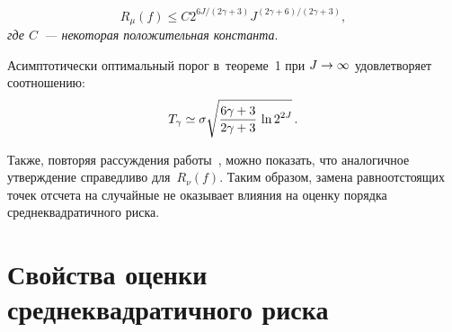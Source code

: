 \begin{multicols}{2}
\noindent
\begin{equation*}
R_{\mu}(f) \leqslant 
C2^{6J/(2\gamma+3)}J^{(2\gamma+6)/(2\gamma+3)},
\end{equation*}
\textit{где $C$~--- некоторая положительная константа}.

\columnbreak

Асимптотически оптимальный порог в~теореме~1 при $J\hm\to\infty$ 
удовлетворяет соотношению:
$$
T_\gamma\simeq\sigma\sqrt{\displaystyle\frac{\displaystyle 6\gamma+3\mathstrut}{\displaystyle 2\gamma+3\mathstrut}\,
\ln2^{2J}}\,.
$$

Также, повторяя рассуждения работы~\cite{CB99}, можно показать, что 
аналогичное утверждение справедливо для~$R_{\nu}(f)$. Таким образом, 
замена равноотстоящих точек отсчета на случайные не оказывает влияния на 
оценку порядка среднеквадратичного риска. 


\section{Свойства оценки среднеквадратичного риска}


\end{multicols}
